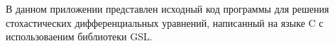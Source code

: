
В данном приложении представлен исходный код программы
для решения стохастических дифференциальных уравнений,
написанный на языке C с использоваеним библиотеки GSL.

\label{app3:1}

%


%

